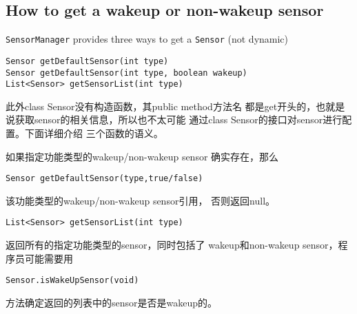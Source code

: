 
\subsection{How to get a wakeup or non-wakeup sensor}

\texttt{SensorManager} provides three ways to get a \texttt{Sensor} (not
dynamic)

\begin{lstlisting}
Sensor getDefaultSensor(int type)
Sensor getDefaultSensor(int type, boolean wakeup)
List<Sensor> getSensorList(int type)
\end{lstlisting}

此外class Sensor没有构造函数，其public method方法名
都是get开头的，也就是说获取sensor的相关信息，所以也不太可能
通过class Sensor的接口对sensor进行配置。下面详细介绍
三个函数的语义。
\par{
如果指定功能类型的wakeup/non-wakeup sensor
确实存在，那么
\begin{lstlisting}
Sensor getDefaultSensor(type,true/false)
\end{lstlisting}
该功能类型的wakeup/non-wakeup sensor引用，
否则返回null。
}
\par{
\begin{lstlisting}
List<Sensor> getSensorList(int type)
\end{lstlisting}
返回所有的指定功能类型的sensor，同时包括了
wakeup和non-wakeup sensor，程序员可能需要用
\begin{lstlisting}
Sensor.isWakeUpSensor(void)
\end{lstlisting}
方法确定返回的列表中的sensor是否是wakeup的。
}

